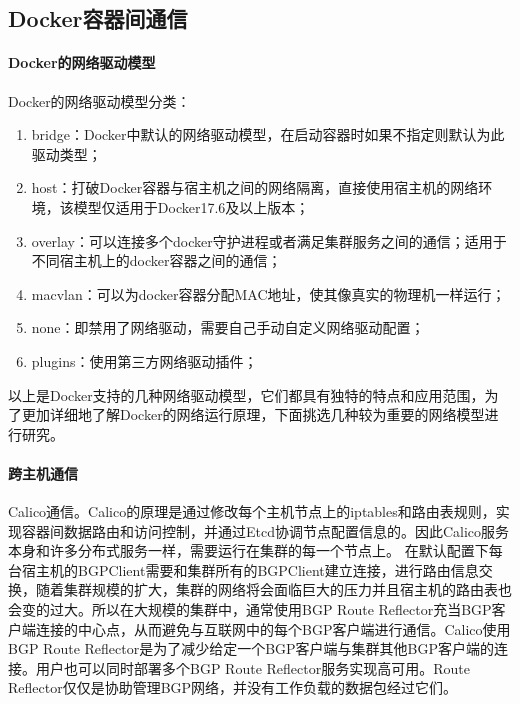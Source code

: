 \documentclass[../../../interview-questions.tex]{subfiles}
\begin{document}
\subsection{Docker容器间通信}

\paragraph{Docker的网络驱动模型}

Docker的网络驱动模型分类：

\begin{enumerate}
    \item {bridge：Docker中默认的网络驱动模型，在启动容器时如果不指定则默认为此驱动类型；}
    \item {host：打破Docker容器与宿主机之间的网络隔离，直接使用宿主机的网络环境，该模型仅适用于Docker17.6及以上版本；}
    \item {overlay：可以连接多个docker守护进程或者满足集群服务之间的通信；适用于不同宿主机上的docker容器之间的通信；}
    \item {macvlan：可以为docker容器分配MAC地址，使其像真实的物理机一样运行；}
    \item {none：即禁用了网络驱动，需要自己手动自定义网络驱动配置；}
    \item {plugins：使用第三方网络驱动插件；}
\end{enumerate}

以上是Docker支持的几种网络驱动模型，它们都具有独特的特点和应用范围，为了更加详细地了解Docker的网络运行原理，下面挑选几种较为重要的网络模型进行研究。

\paragraph{跨主机通信}

Calico通信。Calico的原理是通过修改每个主机节点上的iptables和路由表规则，实现容器间数据路由和访问控制，并通过Etcd协调节点配置信息的。因此Calico服务本身和许多分布式服务一样，需要运行在集群的每一个节点上。
在默认配置下每台宿主机的BGPClient需要和集群所有的BGPClient建立连接，进行路由信息交换，随着集群规模的扩大，集群的网络将会面临巨大的压力并且宿主机的路由表也会变的过大。所以在大规模的集群中，通常使用BGP Route Reflector充当BGP客户端连接的中心点，从而避免与互联网中的每个BGP客户端进行通信。Calico使用BGP Route Reflector是为了减少给定一个BGP客户端与集群其他BGP客户端的连接。用户也可以同时部署多个BGP Route Reflector服务实现高可用。Route Reflector仅仅是协助管理BGP网络，并没有工作负载的数据包经过它们。
\end{document}
